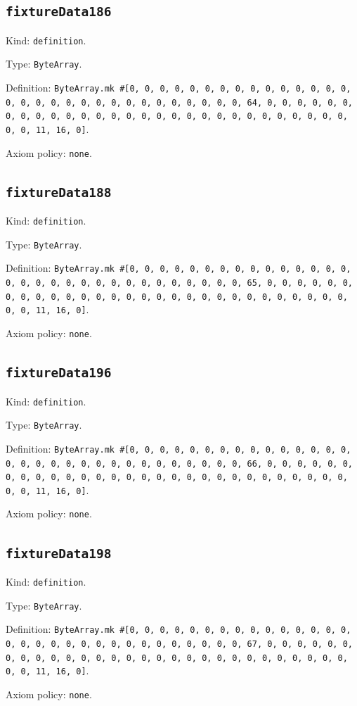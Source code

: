 \documentclass[11pt]{article}
\begin{document}
\subsection*{\texttt{fixtureData186}}
\noindent Kind: \texttt{definition}.\par
\noindent Type: \texttt{ByteArray}.\par
\noindent Definition: \texttt{ByteArray.mk \#[0, 0, 0, 0, 0, 0, 0, 0, 0, 0, 0, 0, 0, 0, 0, 0, 0, 0, 0, 0, 0, 0, 0, 0, 0, 0, 0, 0, 0, 0, 0, 64, 0, 0, 0, 0, 0, 0, 0, 0, 0, 0, 0, 0, 0, 0, 0, 0, 0, 0, 0, 0, 0, 0, 0, 0, 0, 0, 0, 0, 0, 0, 0, 11, 16, 0]}.\par
\noindent Axiom policy: \texttt{none}.\par
\subsection*{\texttt{fixtureData188}}
\noindent Kind: \texttt{definition}.\par
\noindent Type: \texttt{ByteArray}.\par
\noindent Definition: \texttt{ByteArray.mk \#[0, 0, 0, 0, 0, 0, 0, 0, 0, 0, 0, 0, 0, 0, 0, 0, 0, 0, 0, 0, 0, 0, 0, 0, 0, 0, 0, 0, 0, 0, 0, 65, 0, 0, 0, 0, 0, 0, 0, 0, 0, 0, 0, 0, 0, 0, 0, 0, 0, 0, 0, 0, 0, 0, 0, 0, 0, 0, 0, 0, 0, 0, 0, 11, 16, 0]}.\par
\noindent Axiom policy: \texttt{none}.\par
\subsection*{\texttt{fixtureData196}}
\noindent Kind: \texttt{definition}.\par
\noindent Type: \texttt{ByteArray}.\par
\noindent Definition: \texttt{ByteArray.mk \#[0, 0, 0, 0, 0, 0, 0, 0, 0, 0, 0, 0, 0, 0, 0, 0, 0, 0, 0, 0, 0, 0, 0, 0, 0, 0, 0, 0, 0, 0, 0, 66, 0, 0, 0, 0, 0, 0, 0, 0, 0, 0, 0, 0, 0, 0, 0, 0, 0, 0, 0, 0, 0, 0, 0, 0, 0, 0, 0, 0, 0, 0, 0, 11, 16, 0]}.\par
\noindent Axiom policy: \texttt{none}.\par
\subsection*{\texttt{fixtureData198}}
\noindent Kind: \texttt{definition}.\par
\noindent Type: \texttt{ByteArray}.\par
\noindent Definition: \texttt{ByteArray.mk \#[0, 0, 0, 0, 0, 0, 0, 0, 0, 0, 0, 0, 0, 0, 0, 0, 0, 0, 0, 0, 0, 0, 0, 0, 0, 0, 0, 0, 0, 0, 0, 67, 0, 0, 0, 0, 0, 0, 0, 0, 0, 0, 0, 0, 0, 0, 0, 0, 0, 0, 0, 0, 0, 0, 0, 0, 0, 0, 0, 0, 0, 0, 0, 11, 16, 0]}.\par
\noindent Axiom policy: \texttt{none}.\par
\end{document}

